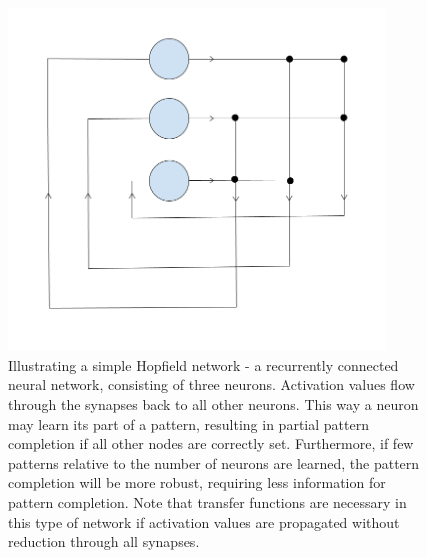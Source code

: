 \begin{figure}
\centering
\includegraphics[width=10cm]{fig/hopfield_net}
\caption{Illustrating a simple Hopfield network - a recurrently connected neural network, consisting of three neurons. Activation values flow through the synapses back to all other neurons. This way a neuron may learn its part of a pattern, resulting in partial pattern completion if all other nodes are correctly set. Furthermore, if few patterns relative to the number of neurons are learned, the pattern completion will be more robust, requiring less  information for pattern completion. Note that transfer functions are necessary in this type of network if activation values are propagated without reduction through all synapses.}
\label{fig:hopfield_net}
\end{figure}

